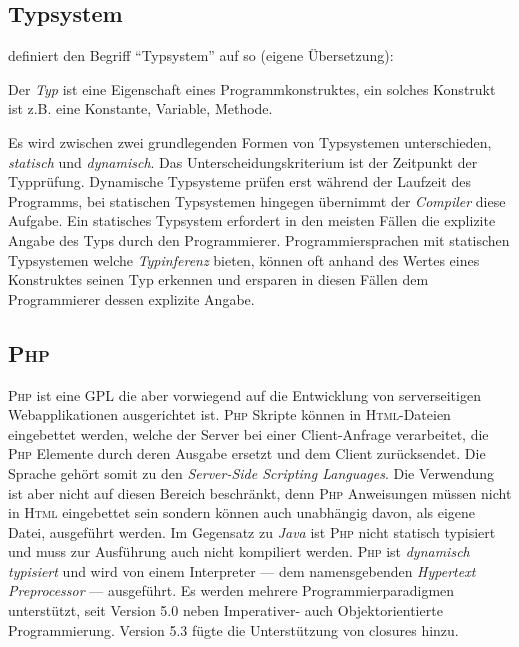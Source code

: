\subsection{Typsystem}
\label{sec:typesystem}

\citeauthor{voelterDSLEngineering} definiert den Begriff \enquote{Typsystem} auf \cite[][S. 253]{voelterDSLEngineering} so (eigene Übersetzung):


Der \emph{Typ} ist eine Eigenschaft eines Programmkonstruktes, ein solches Konstrukt ist z.B. eine Konstante, Variable, Methode.

Es wird zwischen zwei grundlegenden Formen von Typsystemen unterschieden, \emph{statisch} und \emph{dynamisch}. Das Unterscheidungskriterium ist der Zeitpunkt der Typprüfung. Dynamische Typsysteme prüfen erst während der Laufzeit des Programms, bei statischen Typsystemen hingegen übernimmt der \emph{Compiler} diese Aufgabe. Ein statisches Typsystem erfordert in den meisten Fällen die explizite Angabe des Typs durch den Programmierer. Programmiersprachen mit statischen Typsystemen welche \emph{Typinferenz} bieten, können oft anhand des Wertes eines Konstruktes seinen Typ erkennen und ersparen in diesen Fällen dem Programmierer dessen explizite Angabe.

\subsection{\textsc{Php}}
\label{sec:php}

\textsc{Php} ist eine \gls{GPL} die aber vorwiegend auf die Entwicklung von serverseitigen Webapplikationen ausgerichtet ist. \textsc{Php} Skripte können in \textsc{Html}-Dateien eingebettet werden, welche der Server bei einer Client-Anfrage verarbeitet, die \textsc{Php} Elemente durch deren Ausgabe ersetzt und dem Client zurücksendet. Die Sprache gehört somit zu den \emph{Server-Side Scripting Languages}. Die Verwendung ist aber nicht auf diesen Bereich beschränkt, denn \textsc{Php} Anweisungen müssen nicht in \textsc{Html} eingebettet sein sondern können auch unabhängig davon, als eigene Datei, ausgeführt werden.
Im Gegensatz zu \emph{Java} ist \textsc{Php} nicht statisch typisiert und muss zur Ausführung auch nicht kompiliert werden. \textsc{Php} ist \emph{dynamisch typisiert} und wird von einem Interpreter --- dem namensgebenden \emph{Hypertext Preprocessor} --- ausgeführt.
Es werden mehrere Programmierparadigmen unterstützt, seit Version 5.0 neben Imperativer- auch Objektorientierte Programmierung. Version 5.3 fügte die Unterstützung von \glspl{closure} hinzu.

